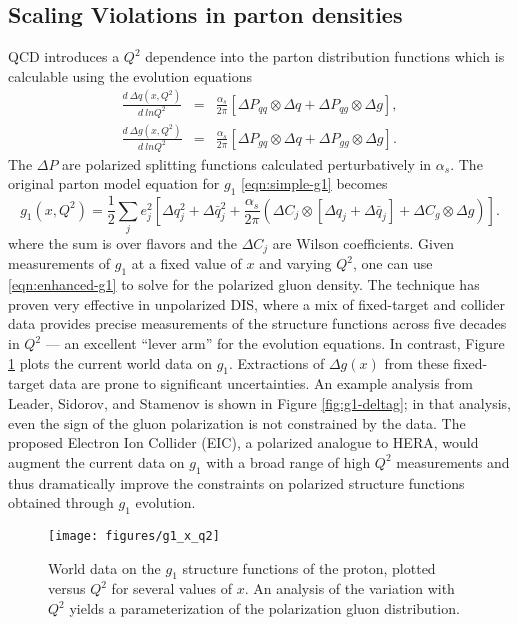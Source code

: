 \subsection{Scaling Violations in parton densities}

QCD introduces a \(Q^2\) dependence into the parton distribution functions which is calculable using the evolution equations
%
\begin{eqnarray}
  \frac{d~\Delta q(x,Q^2)}{d~ln Q^2} &=& \frac{\alpha_s}{2 \pi} \left[ \Delta P_{qq} \otimes \Delta q + \Delta P_{qg} \otimes \Delta g \right], \nonumber \\
  \frac{d~\Delta g(x,Q^2)}{d~ln Q^2} &=& \frac{\alpha_s}{2 \pi} \left[ \Delta P_{gq} \otimes \Delta q + \Delta P_{gg} \otimes \Delta g \right].
\end{eqnarray}
%
The \(\Delta P\) are polarized splitting functions calculated perturbatively in \(\alpha_s\).  The original parton model equation for \(g_1\) \ref{eqn:simple-g1} becomes
%
\begin{equation}
  g_1(x, Q^2) = \frac{1}{2} \sum_{j} e_j^2 \left[\Delta q_j^2 + \Delta \bar{q}_j^2 + \frac{\alpha_s}{2 \pi} \left(\Delta C_j \otimes \left[\Delta q_j + \Delta \bar{q}_j\right] + \Delta C_g \otimes \Delta g\right)\right].
  \label{eqn:enhanced-g1}
\end{equation}
%
where the sum is over flavors and the \(\Delta C_j\) are Wilson coefficients. Given measurements of \(g_1\) at a fixed value of \(x\) and varying \(Q^2\), one can use \ref{eqn:enhanced-g1} to solve for the polarized gluon density. The  technique has proven very effective in unpolarized DIS, where a mix of fixed-target and collider data provides precise measurements of the structure functions across five decades in \(Q^2\) --- an excellent ``lever arm'' for the evolution equations.  In contrast, Figure \ref{fig:g1-versus-q2} plots the current world data on \(g_1\).  Extractions of \(\Delta g(x)\) from these fixed-target data are prone to significant uncertainties.  An example analysis from Leader, Sidorov, and Stamenov is shown in Figure \ref{fig:g1-deltag}; in that analysis, even the sign of the gluon polarization is not constrained by the data. The proposed Electron Ion Collider (EIC), a polarized analogue to HERA, would augment the current data on \(g_1\) with a broad range of high \(Q^2\) measurements and thus dramatically improve the constraints on polarized structure functions obtained through \(g_1\) evolution.

\begin{figure}
  \centering
  \texttt{[image: figures/g1\_x\_q2]}
  \caption{World data on the $g_1$ structure functions of the proton, plotted
  versus $Q^2$ for several values of $x$. An analysis of the variation with
  $Q^2$ yields a parameterization of the polarization gluon distribution.}
  \label{fig:g1-versus-q2}
\end{figure}

